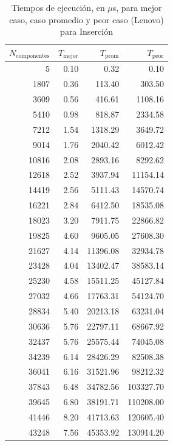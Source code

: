 \documentclass{homework}
\begin{document}
    \begin{table}[H] 
        \footnotesize
        \centering 
        \begin{tabular}{|r|r|r|r|} 
                \hline
                $N_{\text{componentes}}$ & $T_{\text{mejor}}$ & $T_{\text{prom}}$ & $T_{\text{peor}}$ \\
                \hline  
                5 & 0.10 & 0.32 & 0.10 \\ 
                1807 & 0.36 & 113.40 & 303.50 \\ 
                3609 & 0.56 & 416.61 & 1108.16 \\ 
                5410 & 0.98 & 818.87 & 2334.58 \\ 
                7212 & 1.54 & 1318.29 & 3649.72 \\ 
                9014 & 1.76 & 2040.42 & 6012.42 \\ 
                10816 & 2.08 & 2893.16 & 8292.62 \\ 
                12618 & 2.52 & 3937.94 & 11154.14 \\ 
                14419 & 2.56 & 5111.43 & 14570.74 \\ 
                16221 & 2.84 & 6412.50 & 18535.08 \\ 
                18023 & 3.20 & 7911.75 & 22866.82 \\ 
                19825 & 4.60 & 9605.05 & 27608.30 \\ 
                21627 & 4.14 & 11396.08 & 32934.78 \\ 
                23428 & 4.04 & 13402.47 & 38583.14 \\ 
                25230 & 4.58 & 15511.25 & 45127.84 \\ 
                27032 & 4.66 & 17763.31 & 54124.70 \\ 
                28834 & 5.40 & 20213.18 & 63231.04 \\ 
                30636 & 5.76 & 22797.11 & 68667.92 \\ 
                32437 & 5.76 & 25575.44 & 74045.08 \\ 
                34239 & 6.14 & 28426.29 & 82508.38 \\ 
                36041 & 6.16 & 31521.96 & 98212.32 \\ 
                37843 & 6.48 & 34782.56 & 103327.70 \\ 
                39645 & 6.80 & 38191.71 & 110208.00 \\ 
                41446 & 8.20 & 41713.63 & 120605.40 \\ 
                43248 & 7.56 & 45353.92 & 130914.20 \\ 
                \hline
        \end{tabular}
        \caption{Tiempos de ejecución, en $\mu$s, para mejor caso, caso promedio y peor caso (Lenovo) para Inserción}
    \end{table}
\end{document}
